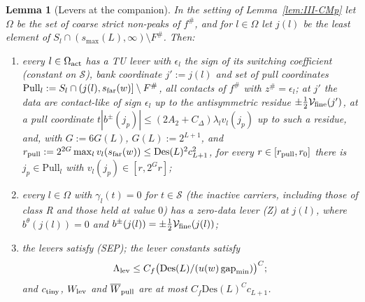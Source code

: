 \documentclass[10pt]{amsart}
\newtheorem{lemma}[theorem]{Lemma}
\theoremstyle{definition}
\theoremstyle{remark}
\newcommand{\gap}{\operatorname{gap}}
\begin{document}
\begin{lemma}[Levers at the companion]\label{lem:III-LV}
In the setting of Lemma~\textup{\ref{lem:III-CMp}} let $\Omega$ be the set of
coarse strict non-peaks of $f^\#$, and for $l\in\Omega$ let $j(l)$ be the least
element of $S_l\cap(s_{\max}(L),\infty)\setminus F^\#$.  Then:
\begin{enumerate}
\item[(a)] every $l\in\Omega_{\rm act}$ has a TU lever with $\epsilon_l$ the sign
of its switching coefficient \textup{(}constant on $\mathcal S$\textup{)}, bank
coordinate $j':=j(l)$ and set of pull coordinates $\mathrm{Pull}_l:=S_l\cap
(j(l),s_{\rm far}(w)]\setminus F^\#$, all contacts of $f^\#$ with
$z^\#=\epsilon_l$; at $j'$ the data are contact-like of
sign $\epsilon_l$ up to the antisymmetric residue $\pm\frac12\mathcal V_{\rm
fine}(j')$, at a pull coordinate $t|b^\pm(j_p)|\le(2A_2+C_\Delta)\lambda_lv_l(j_p)$
up to such a residue, and, with $G:=6G(L)$, $G(L):=2^{L+1}$, and
$r_{\rm pull}:=2^{2G}\max_lv_l(s_{\rm far}(w))\le\mathrm{Des}(L)^2c_{L+1}^2$, for
every $r\in[r_{\rm pull},r_0]$ there is $j_p\in\mathrm{Pull}_l$ with
$v_l(j_p)\in[r,2^Gr]$;
\item[(b)] every $l\in\Omega$ with $\gamma_l(t)=0$ for $t\in\mathcal S$ \textup{(}the
inactive carriers, including those of class R and those held at value $0$\textup{)}
has a zero-data lever \textup{(Z)} at $j(l)$, where $b^\theta(j(l))=0$ and
$b^\pm(j(l))=\pm\frac12\mathcal V_{\rm fine}(j(l))$;
\item[(c)] the levers satisfy \textup{(SEP)}; the lever constants satisfy
\[
 \Lambda_{\rm lev}\le C_f\big(\mathrm{Des}(L)/(u(w)\gap_{\min})\big)^C;
\]
and $c_{\rm tiny}$,
$W_{\rm lev}$ and $\overline W_{\rm pull}$ are at most $C_f\mathrm{Des}(L)^Cc_{L+1}$.
\end{enumerate}
\end{lemma}
\end{document}
